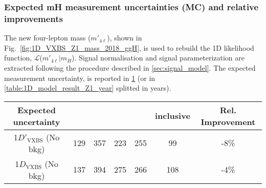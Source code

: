 \subsubsection{Expected mH measurement uncertainties (MC) and relative improvements}
The new four-lepton mass ($m'_{4\ell}$), shown in Fig.~\ref{fig:1D_VXBS_Z1_mass_2018_ggH},
is used to rebuild the 1D likelihood function, $\mathcal{L}$($m'_{4\ell}|m_{H}$). Signal normalisation and signal parameterization are extracted following the procedure described in \ref{sec:signal_model}.
The expected \mH measurement uncertainty, is reported in \cref{table:1D_model_result_Z1} (or in \cref{table:1D_model_result_Z1_year}
splitted in years).
\begin{table}[ht]	
\begin{center}
    \begin{tabular}{ccccccc}
        \hline			
    Expected uncertainty	&	\fourmu	&	\foure	&	\twoetwomu	&\twomutwoe	& inclusive & Rel. Improvement \\
        \hline			
        1$D'_\text{VXBS}$ (No bkg)	&	129	&	357	&	223	&	255	&	99	&	-8\%	\\
        1$D_\text{VXBS}$  (No bkg)	&	137	&	394	&	275	&	266	&	108 &	-4\%	\\
        \hline
\end{tabular}
\label{table:1D_model_result_Z1}
\end{center}
\end{table}
